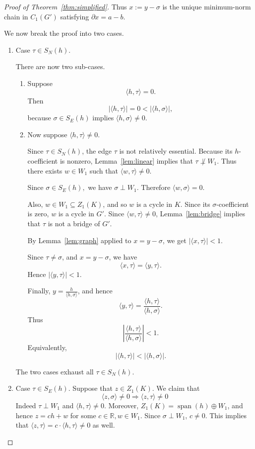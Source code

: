 \documentclass[11pt]{amsart}
\theoremstyle{theorem}
\theoremstyle{remark}
\theoremstyle{definition}
\newcommand {\la}   {{\langle}}
\newcommand {\ra}   {{\rangle}}
\begin{document}
\begin{proof}[Proof of Theorem~\ref{thm:simplified}]
Thus
$
x:=y-\sigma
$
is the unique minimum-norm chain in \(C_1(G')\) satisfying
$
\partial x=a-b
$.

We now break the proof into two cases.
\begin{enumerate}
\item Case $\tau\in S_N(h)$.

There are now two sub-cases.
\begin{enumerate}
\item
Suppose
\[
\langle h,\tau\rangle=0.
\]
Then
\[
|\langle h,\tau\rangle|
=
0
<
|\langle h,\sigma\rangle|,
\]
because \(\sigma\in S_E(h)\) implies
$
\langle h,\sigma\rangle\neq 0
$.

\item
Now suppose 
$
\langle h,\tau\rangle\neq 0.
$

Since
$
\tau\in S_N(h)
$,
the edge \(\tau\) is not relatively essential. Because its \(h\)-coefficient is
nonzero, 
Lemma~\ref{lem:linear}
implies that
$
\tau\not\perp W_1
$.
Thus there exists
$
w\in W_1
$
such that
$
\langle w,\tau\rangle\neq 0
$.

Since
$
\sigma\in S_E(h),
$
we have
$
\sigma\perp W_1.
$
Therefore
$
\langle w,\sigma\rangle=0.
$

Also,
$
w\in W_1\subseteq Z_1(K)
$,
and 
so \(w\) is a cycle in \(K\). Since its \(\sigma\)-coefficient is zero, \(w\)
is a cycle in \(G'\). Since
$
\langle w,\tau\rangle\neq 0
$,
Lemma~\ref{lem:bridge}
implies that \(\tau\) is not a bridge of \(G'\).

By 
Lemma~\ref{lem:graph}
applied to
$
x=y-\sigma
$,
we get
$
|\langle x,\tau\rangle|<1
$.

Since \(\tau\neq\sigma\), and \(x=y-\sigma\), we have
\[
\langle x,\tau\rangle
=
\langle y,\tau\rangle.
\]
Hence
$
|\langle y,\tau\rangle|<1
$.

Finally,
$
y=\frac{h}{\langle h,\sigma\rangle}
$, and
hence
\[
\langle y,\tau\rangle
=
\frac{\langle h,\tau\rangle}{\langle h,\sigma\rangle}.
\]
Thus
\[
\left|
\frac{\langle h,\tau\rangle}
     {\langle h,\sigma\rangle}
\right|
<1.
\]
Equivalently,
\[
|\langle h,\tau\rangle|
<
|\langle h,\sigma\rangle|.
\]
\end{enumerate}
The two cases exhaust all
$
\tau\in S_N(h)
$.

\item Case $\tau \in S_E(h)$. 
Suppose that $z \in Z_1(K)$. We claim that 
\begin{equation}
\label{eqn:proof:thm:simplified:0}
  \la z, \sigma\ra \neq 0  \Rightarrow \la z, \tau\ra \neq 0
\end{equation}
Indeed $\tau \perp W_1$ and $\la h, \tau \ra \neq 0$. Moreover,  
$Z_1(K) = \operatorname{span}(h) \oplus W_1$, and hence
$z = c h + w$ for some $c \in \mathbb{R}, w \in W_1$. Since $\sigma \perp W_1$,
$c \neq 0$. This implies that 
$\la z , \tau\ra = c \cdot \la h,\tau\ra \neq 0$ as well. 


\end{enumerate}
\end{proof}
\end{document}
